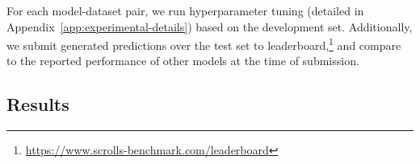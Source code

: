 For each model-dataset pair, we run hyperparameter tuning (detailed in Appendix~\ref{app:experimental-details}) based on the development set.
Additionally, we submit generated predictions over the test set to \SCROLLS{} leaderboard,\footnote{\label{fn:leaderboard}\url{https://www.scrolls-benchmark.com/leaderboard}} and compare to the reported performance of other models at the time of submission.
\newcommand\leaderboardfootnote{\value{footnote}}


\subsection{Results}
\label{subsec:results}
\begin{table*}[th]
\footnotesize
\addtolength{\tabcolsep}{-2pt}  
\centering
{}
\caption{Main results on the \SCROLLS{} benchmark. Chunk/Input refers to the chunk size used ($c$) and to the maximal input length ($n$). Avg is the average \SCROLLS{} score as described in . Development scores for QuALITY are only for the full set (T). $\dagger$ indicates reported results from \SCROLLS{} public leaderboard.\footnotemark[\leaderboardfootnote{}]
\ledbaseglobal{} scores were reported by  and are lower than 
our LED$_{\mathtt{base}}$ implementation, presumably since our implementation uses all question tokens for global attention rather than just the first one. The results for LongT5  and UL2 were submitted to the SCROLLS leaderboard by their authors.}


\label{tab:main_results}
\end{table*}
 
